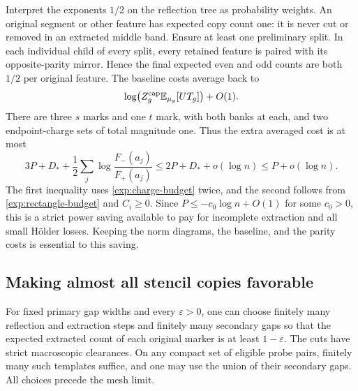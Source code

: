 Interpret the exponents $1/2$ on the reflection tree as probability
weights.  An original segment or other feature has expected copy count
one: it is never cut or removed in an extracted middle band.  Ensure
at least one preliminary split.  In each individual child of every
split, every retained feature is paired with its opposite-parity
mirror.  Hence the final expected even and odd counts are both $1/2$
per original feature.  The baseline costs average back to
\begin{equation}
 \log\bigl(Z_g^{\rm cap}\mathbb E_{\mu_g}[UT_g]\bigr)+O(1).
 \label{hol:baseline}
\end{equation}
There are three $s$ marks and one $t$ mark, with both banks at each,
and two endpoint-charge sets of total magnitude one.  Thus the extra
averaged cost is at most
\begin{equation}
 3P+D_*+\frac12\sum_j\log\frac{F_-(a_j)}{F_+(a_j)}
 \le 2P+D_*+o(\log n)
 \le P+o(\log n).
 \label{hol:strict-budget}
\end{equation}
The first inequality uses \eqref{exp:charge-budget} twice, and the
second follows from \eqref{exp:rectangle-budget} and $C_i\ge0$.  Since
$P\le-c_0\log n+O(1)$ for some $c_0>0$, this is a strict power saving
available to pay for incomplete extraction and all small H\"older
losses.  Keeping the norm diagrams, the baseline, and the parity costs
is essential to this saving.

\subsection{Making almost all stencil copies favorable}

\begin{lemma}
\label{hol:templates}
For fixed primary gap widths and every $\varepsilon>0$, one can choose
finitely many reflection and extraction steps and finitely many
secondary gaps so that the expected extracted count of each original
marker is at least $1-\varepsilon$.  The cuts have strict macroscopic
clearances.  On any compact set of eligible probe pairs, finitely many
such templates suffice, and one may use the union of their secondary
gaps.  All choices precede the mesh limit.
\end{lemma}

